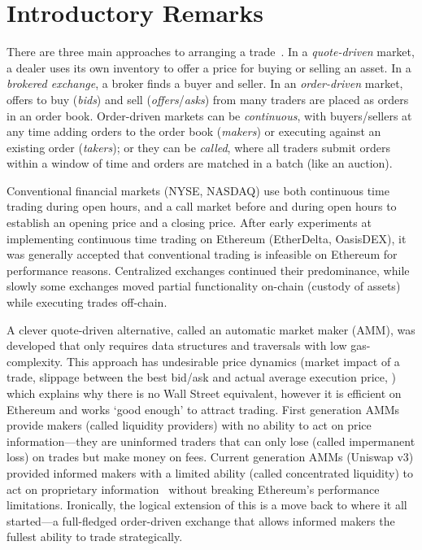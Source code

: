 



\section{Introductory Remarks}

There are three main approaches to arranging a trade~\cite{Har03}. In a \emph{quote-driven} market, a dealer uses its own inventory to offer a price for buying or selling an asset. In a \emph{brokered exchange}, a broker finds a buyer and seller. In an \emph{order-driven} market, offers to buy (\emph{bids}) and sell (\emph{offers}/\emph{asks}) from many traders are placed as orders in an order book. Order-driven markets can be \emph{continuous}, with buyers/sellers at any time adding orders to the order book (\emph{makers}) or executing against an existing order (\emph{takers}); or they can be \emph{called}, where all traders submit orders within a window of time and orders are matched in a batch (like an auction). 

Conventional financial markets (\eg NYSE, NASDAQ) use both continuous time trading during open hours, and a call market before and during open hours to establish an opening price and a closing price. After early experiments at implementing continuous time trading on Ethereum (\eg EtherDelta, OasisDEX), it was generally accepted that conventional trading is infeasible on Ethereum for performance reasons. Centralized exchanges continued their predominance, while slowly some exchanges moved partial functionality on-chain (\eg custody of assets) while executing trades off-chain. 

A clever quote-driven alternative, called an automatic market maker (AMM), was developed that only requires data structures and traversals with low gas-complexity. This approach has undesirable price dynamics (\eg market impact of a trade, slippage between the best bid/ask and actual average execution price, \etc) which explains why there is no Wall Street equivalent, however it is efficient on Ethereum and works `good enough' to attract trading. First generation AMMs provide makers (called liquidity providers) with no ability to act on price information---they are uninformed traders that can only lose (called impermanent loss) on trades but make money on fees. Current generation AMMs (\eg Uniswap v3) provided informed makers with a limited ability (called concentrated liquidity) to act on proprietary information~\cite{Park21} without breaking Ethereum's performance limitations. Ironically, the logical extension of this is a move back to where it all started---a full-fledged order-driven exchange that allows informed makers the fullest ability to trade strategically.



